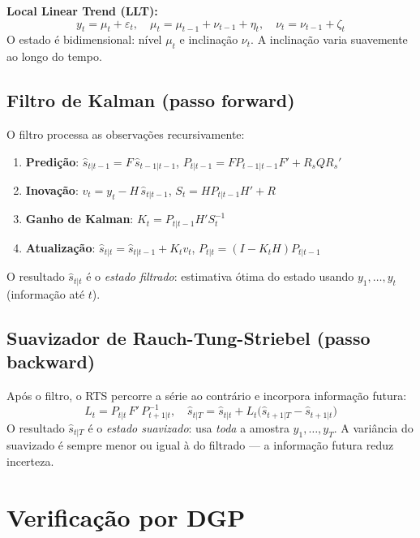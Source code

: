 \medskip
\textbf{Local Linear Trend (LLT):}
\[
  y_t = \mu_t + \varepsilon_t, \quad
  \mu_t = \mu_{t-1} + \nu_{t-1} + \eta_t, \quad
  \nu_t = \nu_{t-1} + \zeta_t
\]
O estado é bidimensional: nível $\mu_t$ e inclinação $\nu_t$.
A inclinação varia suavemente ao longo do tempo.

\subsection*{Filtro de Kalman (passo forward)}

O filtro processa as observações recursivamente:

\begin{enumerate}
  \item \textbf{Predição}: $\hat{s}_{t|t-1} = F\,\hat{s}_{t-1|t-1}$,\quad
    $P_{t|t-1} = F P_{t-1|t-1} F' + R_s Q R_s'$

  \item \textbf{Inovação}: $v_t = y_t - H\,\hat{s}_{t|t-1}$,\quad
    $S_t = H P_{t|t-1} H' + R$

  \item \textbf{Ganho de Kalman}: $K_t = P_{t|t-1} H' S_t^{-1}$

  \item \textbf{Atualização}: $\hat{s}_{t|t} = \hat{s}_{t|t-1} + K_t v_t$,\quad
    $P_{t|t} = (I - K_t H) P_{t|t-1}$
\end{enumerate}

O resultado $\hat{s}_{t|t}$ é o \emph{estado filtrado}: estimativa ótima do
estado usando $y_1, \ldots, y_t$ (informação até $t$).

\subsection*{Suavizador de Rauch-Tung-Striebel (passo backward)}

Após o filtro, o RTS percorre a série ao contrário e incorpora informação
futura:
\[
  L_t = P_{t|t}\, F'\, P_{t+1|t}^{-1}, \quad
  \hat{s}_{t|T} = \hat{s}_{t|t} + L_t\bigl(\hat{s}_{t+1|T} - \hat{s}_{t+1|t}\bigr)
\]
O resultado $\hat{s}_{t|T}$ é o \emph{estado suavizado}: usa \emph{toda} a
amostra $y_1, \ldots, y_T$. A variância do suavizado é sempre menor ou igual
à do filtrado — a informação futura reduz incerteza.

\section{Verificação por DGP}

